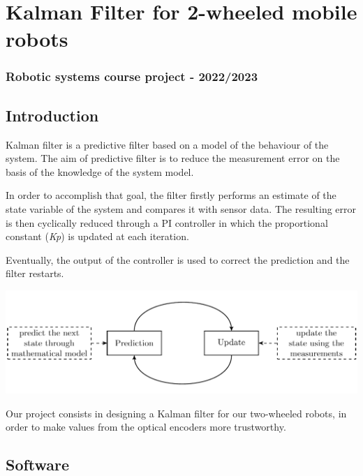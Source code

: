 \hypertarget{kalman-filter-for-2-wheeled-mobile-robots}{%
\section{Kalman Filter for 2-wheeled mobile
robots}\label{kalman-filter-for-2-wheeled-mobile-robots}}

\hypertarget{robotic-systems-course-project---20222023}{%
\subsubsection{Robotic systems course project -
2022/2023}\label{robotic-systems-course-project---20222023}}

\hypertarget{introduction}{%
\subsection{Introduction}\label{introduction}}

Kalman filter is a predictive filter based on a model of the behaviour
of the system. The aim of predictive filter is to reduce the measurement
error on the basis of the knowledge of the system model.

In order to accomplish that goal, the filter firstly performs an
estimate of the state variable of the system and compares it with sensor
data. The resulting error is then cyclically reduced through a PI
controller in which the proportional constant (\emph{Kp}) is updated at
each iteration.

Eventually, the output of the controller is used to correct the
prediction and the filter restarts.

\includegraphics{pics/kf.png}

Our project consists in designing a Kalman filter for our two-wheeled
robots, in order to make values from the optical encoders more
trustworthy.

\hypertarget{software}{%
\subsection{Software}\label{software}}

